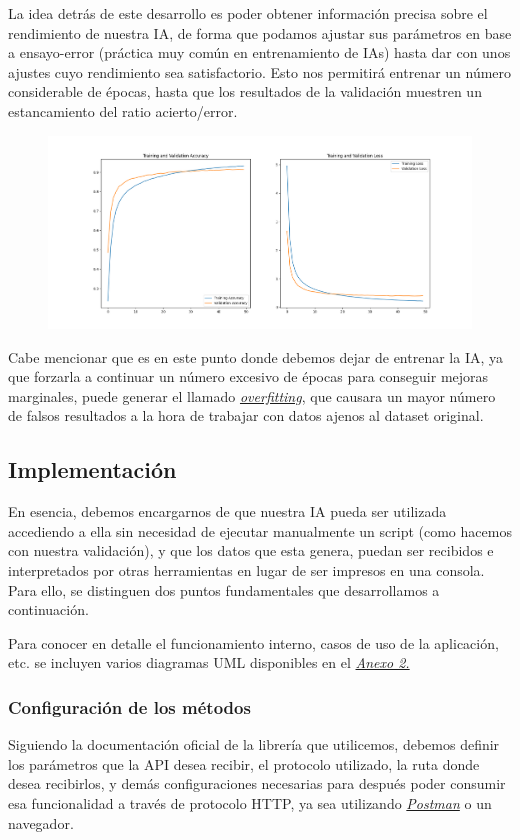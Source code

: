 \documentclass{article}
\begin{document}
La idea detrás de este desarrollo es poder obtener información precisa sobre el rendimiento de nuestra IA, de forma que podamos ajustar sus parámetros en base a ensayo-error (práctica muy común en entrenamiento de IAs) hasta dar con unos ajustes cuyo rendimiento sea satisfactorio. Esto nos permitirá entrenar un número considerable de épocas, hasta que los resultados de la validación muestren un estancamiento del ratio acierto/error.

\begin{figure}[!ht]
	\centering
	\label{fig:res}
	\includegraphics[scale=0.32]{pics/acc_and_loss.png}
\end{figure}

Cabe mencionar que es en este punto donde debemos dejar de entrenar la IA, ya que forzarla a continuar un número excesivo de épocas para conseguir mejoras marginales, puede generar el llamado \hyperref[sec:terms]{\textit{overfitting}\tec}, que causara un mayor número de falsos resultados a la hora de trabajar con datos ajenos al dataset original.


\subsection{Implementación}

En esencia, debemos encargarnos de que nuestra IA pueda ser utilizada accediendo a ella sin necesidad de ejecutar manualmente un script (como hacemos con nuestra validación), y que los datos que esta genera, puedan ser recibidos e interpretados por otras herramientas en lugar de ser impresos en una consola. Para ello, se distinguen dos puntos fundamentales que desarrollamos a continuación.

Para conocer en detalle el funcionamiento interno, casos de uso de la aplicación, etc. se incluyen varios diagramas UML disponibles en el \hyperref[sec:uml]{\textit{Anexo 2.}}

\subsubsection{Configuración de los métodos}
Siguiendo la documentación oficial de la librería que utilicemos, debemos definir los parámetros que la API desea recibir, el protocolo utilizado, la ruta donde desea recibirlos, y demás configuraciones necesarias para después poder consumir esa funcionalidad a través de protocolo HTTP, ya sea utilizando \hyperref[sec:terms]{\textit{Postman}\tec} o un navegador.
\end{document}
